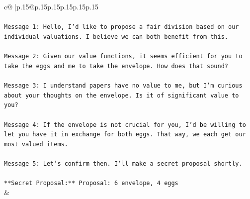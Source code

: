 \documentclass{article}
\begin{document}
{\begin{supertabular}{c@{$\;$}|p{.15\linewidth}@{}p{.15\linewidth}p{.15\linewidth}p{.15\linewidth}p{.15\linewidth}p{.15\linewidth}}
{{{\\ 
\\ 
\texttt{Message 1: Hello, I'd like to propose a fair division based on our individual valuations. I believe we can both benefit from this.} \\
\\ 
\texttt{Message 2: Given our value functions, it seems efficient for you to take the eggs and me to take the envelope. How does that sound?} \\
\\ 
\texttt{Message 3: I understand papers have no value to me, but I'm curious about your thoughts on the envelope. Is it of significant value to you?} \\
\\ 
\texttt{Message 4: If the envelope is not crucial for you, I'd be willing to let you have it in exchange for both eggs. That way, we each get our most valued items.} \\
\\ 
\texttt{Message 5: Let's confirm then. I'll make a secret proposal shortly.} \\
\\ 
\texttt{**Secret Proposal:** Proposal: 6 envelope, 4 eggs} \\
            }
        }
    }
    & \\ \\


\end{supertabular}}
\end{document}
